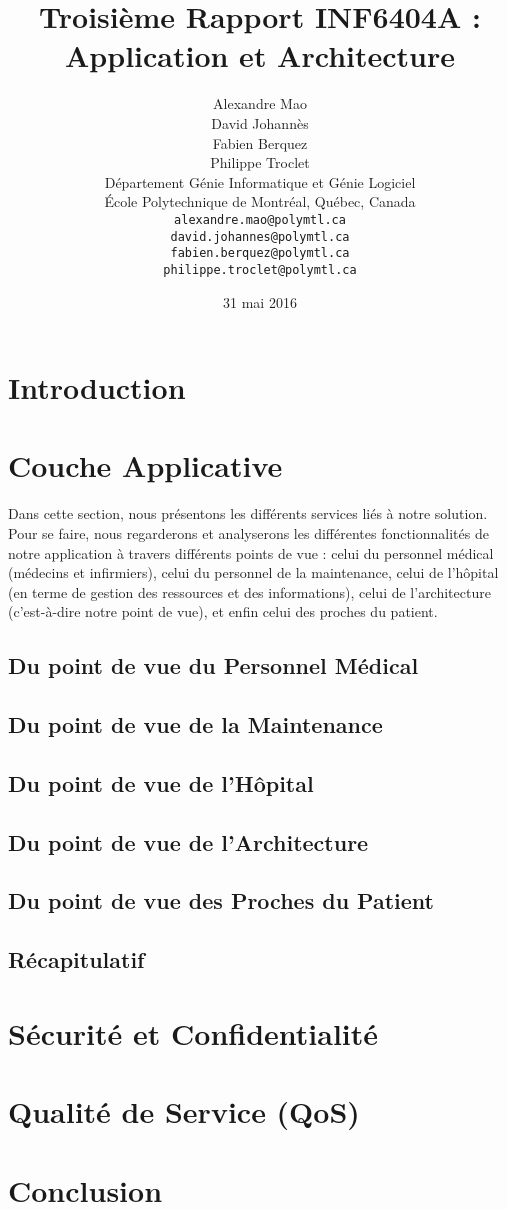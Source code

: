 \documentclass{article}
\title{Troisième Rapport INF6404A : Application et Architecture}
\author{
	Alexandre Mao\\
	David Johannès \\
	Fabien Berquez \\
	Philippe Troclet \\
	D\'{e}partement G\'{e}nie Informatique et G\'{e}nie Logiciel \\
	\'{E}cole Polytechnique de Montr\'{e}al, Qu\'{e}bec, Canada \\
	\texttt{alexandre.mao@polymtl.ca}\\
	\texttt{david.johannes@polymtl.ca}\\
	\texttt{fabien.berquez@polymtl.ca}   \\
	\texttt{philippe.troclet@polymtl.ca}   \\
}
\date{31 mai 2016}
\begin{document}
\maketitle

\section{Introduction}


 
\section{Couche Applicative}
Dans cette section, nous présentons les différents services liés à notre solution. Pour se faire, nous regarderons et analyserons les différentes fonctionnalités de notre application à travers différents points de vue : celui du personnel médical (médecins et infirmiers), celui du personnel de la maintenance, celui de l'hôpital (en terme de gestion des ressources et des informations), celui de l'architecture (c'est-à-dire notre point de vue), et enfin celui des proches du patient.

\subsection{Du point de vue du Personnel Médical}

\subsection{Du point de vue de la Maintenance}

\subsection{Du point de vue de l'Hôpital}

\subsection{Du point de vue de l'Architecture}

\subsection{Du point de vue des Proches du Patient}

\subsection{Récapitulatif}


\section{Sécurité et Confidentialité}


\section{Qualité de Service (QoS)}


\section{Conclusion}










\end{document}
